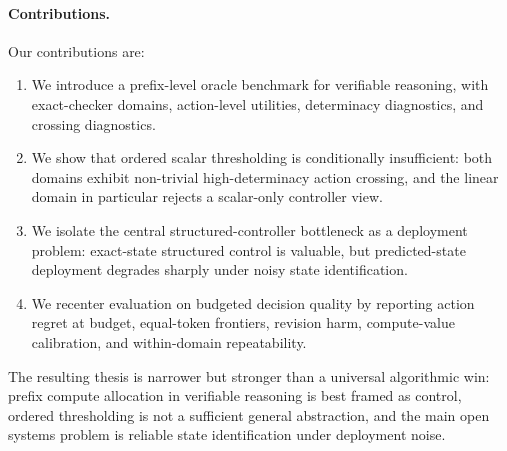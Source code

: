 \paragraph{Contributions.}
Our contributions are:
\begin{enumerate}[leftmargin=1.5em]
  \item We introduce a prefix-level oracle benchmark for verifiable reasoning, with exact-checker domains, action-level utilities, determinacy diagnostics, and crossing diagnostics.
  \item We show that ordered scalar thresholding is conditionally insufficient: both domains exhibit non-trivial high-determinacy action crossing, and the linear domain in particular rejects a scalar-only controller view.
  \item We isolate the central structured-controller bottleneck as a deployment problem: exact-state structured control is valuable, but predicted-state deployment degrades sharply under noisy state identification.
  \item We recenter evaluation on budgeted decision quality by reporting action regret at budget, equal-token frontiers, revision harm, compute-value calibration, and within-domain repeatability.
\end{enumerate}

The resulting thesis is narrower but stronger than a universal algorithmic win:
prefix compute allocation in verifiable reasoning is best framed as \processstate control, ordered thresholding is not a sufficient general abstraction, and the main open systems problem is reliable state identification under deployment noise.
